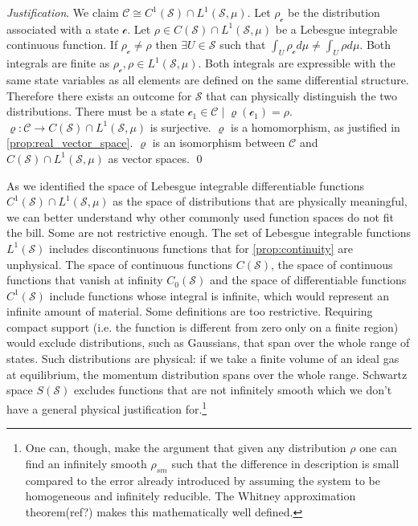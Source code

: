 \documentclass[aps,pra,10pt,twocolumn,floatfix,nofootinbib]{revtex4-1}
\numberwithin{equation}{section}
\theoremstyle{definition}
\newenvironment{justification}{\emph{Justification}.}{\qed}
\begin{document}
\begin{justification}
	We claim $\mathcal{C} \cong C^1(\mathcal{S}) \cap L^1(\mathcal{S}, \mu)$. Let $\rho_\mathcal{c}$ be the distribution associated with a state $\mathcal{c}$. Let $\rho \in C(\mathcal{S}) \cap  L^1(\mathcal{S}, \mu)$ be a Lebesgue integrable continuous function. If $\rho_\mathcal{c} \neq \rho$ then $\exists U \in \mathcal{S}$ such that $\int_{U} \rho_\mathcal{c} d \mu \neq \int_{U} \rho d \mu$. Both integrals are finite as $\rho_\mathcal{c}, \rho \in L^1(\mathcal{S}, \mu)$. Both integrals are expressible with the same state variables as all elements are defined on the same differential structure. Therefore there exists an outcome for $\mathcal{S}$ that can physically distinguish the two distributions. There must be a state $\mathcal{c}_1 \in \mathcal{C} \; | \; \varrho(\mathcal{c}_1)=\rho$. $\varrho : \mathcal{C} \rightarrow C(\mathcal{S}) \cap  L^1(\mathcal{S}, \mu)$ is surjective. $\varrho$ is a homomorphism, as justified in \ref{prop:real_vector_space}. $\varrho$ is an isomorphism between $\mathcal{C}$ and $C(\mathcal{S}) \cap  L^1(\mathcal{S}, \mu)$ as vector spaces.
\end{justification}

As we identified the space of Lebesgue integrable differentiable functions $C^1(\mathcal{S}) \cap  L^1(\mathcal{S}, \mu)$ as the space of distributions that are physically meaningful, we can better understand why other commonly used function spaces do not fit the bill. Some are not restrictive enough. The set of Lebesgue integrable functions $L^1(\mathcal{S})$ includes discontinuous functions that for \ref{prop:continuity} are unphysical. The space of continuous functions $C(\mathcal{S})$, the space of continuous functions that vanish at infinity $C_0(\mathcal{S})$ and the space of differentiable functions $C^1(\mathcal{S})$ include functions whose integral is infinite, which would represent an infinite amount of material. Some definitions are too restrictive. Requiring compact support (i.e. the function is different from zero only on a finite region) would exclude distributions, such as Gaussians, that span over the whole range of states. Such distributions are physical: if we take a finite volume of an ideal gas at equilibrium, the momentum distribution spans over the whole range. Schwartz space $S(\mathcal{S})$ excludes functions that are not infinitely smooth which we don't have a general physical justification for.\footnote{One can, though, make the argument that given any distribution $\rho$ one can find an infinitely smooth $\rho_{sm}$ such that the difference in description is small compared to the error already introduced by assuming the system to be homogeneous and infinitely reducible. The Whitney approximation theorem(ref?) makes this mathematically well defined.}
\end{document}
